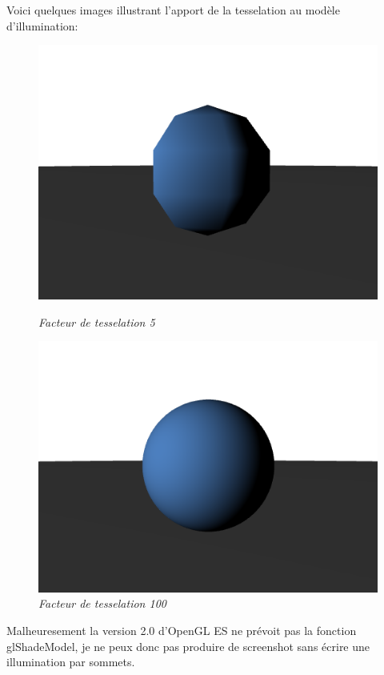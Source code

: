 \documentclass[12pt,letterpaper]{article}
\begin{document}
	Voici quelques images illustrant l'apport de la tesselation au modèle d'illumination:\\
	\newpage

\begin{figure}[h!]
	\centering
	\includegraphics[scale=0.3]{images/tess1.png}
	\caption{\textit{Facteur de tesselation 5}}
	\includegraphics[scale=0.3]{images/rast.png}
	\caption{\textit{Facteur de tesselation 100}}
\end{figure}

	Malheuresement la version 2.0 d'OpenGL ES ne prévoit pas la fonction glShadeModel, je ne peux donc pas produire de screenshot sans écrire une illumination par sommets.\\
\end{document}
